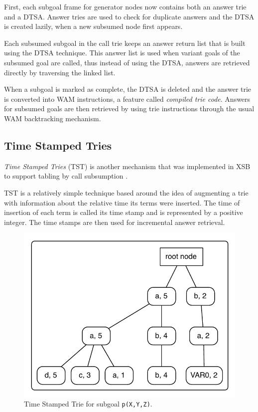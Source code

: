 First, each subgoal frame for generator nodes now contains both an answer trie and a DTSA.
Answer tries are used to check for duplicate answers and the DTSA is created lazily, when a new subsumed node
first appears.

Each subsumed subgoal in the call trie keeps an answer return list that is built using the DTSA technique.
This answer list is used when variant goals of the subsumed goal are called, thus instead of using
the DTSA, answers are retrieved directly by traversing the linked list.

When a subgoal is marked as complete, the DTSA is deleted and the answer trie is converted into WAM instructions, a feature called
\textit{compiled trie code}. Answers for subsumed goals are then retrieved by using trie instructions
through the usual WAM backtracking mechanism.

\subsection{Time Stamped Tries} \label{sec:time_stamped_tries}

\textit{Time Stamped Tries} (TST) is another mechanism that was implemented in XSB
to support tabling by call subsumption \cite{Johnson-99}.

TST is a relatively simple technique based around the idea of augmenting a trie with information about the relative time
its terms were inserted. The time of insertion of each term is called its time stamp and is represented by a
positive integer. The time stamps are then used for incremental answer retrieval.

\begin{figure}[ht]
  \centering
    \includegraphics[scale=0.6]{tst_1.pdf}
  \caption{Time Stamped Trie for subgoal \texttt{p(X,Y,Z)}.}
  \label{fig:tst_1}
\end{figure}

